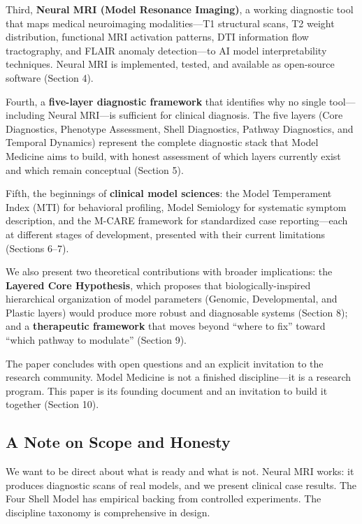 \documentclass[11pt]{article}
\begin{document}
Third, \textbf{Neural MRI (Model Resonance Imaging)}, a working diagnostic tool that maps medical neuroimaging modalities---T1 structural scans, T2 weight distribution, functional MRI activation patterns, DTI information flow tractography, and FLAIR anomaly detection---to AI model interpretability techniques. Neural MRI is implemented, tested, and available as open-source software (Section 4).

Fourth, a \textbf{five-layer diagnostic framework} that identifies why no single tool---including Neural MRI---is sufficient for clinical diagnosis. The five layers (Core Diagnostics, Phenotype Assessment, Shell Diagnostics, Pathway Diagnostics, and Temporal Dynamics) represent the complete diagnostic stack that Model Medicine aims to build, with honest assessment of which layers currently exist and which remain conceptual (Section 5).

Fifth, the beginnings of \textbf{clinical model sciences}: the Model Temperament Index (MTI) for behavioral profiling, Model Semiology for systematic symptom description, and the M-CARE framework for standardized case reporting---each at different stages of development, presented with their current limitations (Sections 6--7).

We also present two theoretical contributions with broader implications: the \textbf{Layered Core Hypothesis}, which proposes that biologically-inspired hierarchical organization of model parameters (Genomic, Developmental, and Plastic layers) would produce more robust and diagnosable systems (Section 8); and a \textbf{therapeutic framework} that moves beyond ``where to fix'' toward ``which pathway to modulate'' (Section 9).

The paper concludes with open questions and an explicit invitation to the research community. Model Medicine is not a finished discipline---it is a research program. This paper is its founding document and an invitation to build it together (Section 10).

\subsection{A Note on Scope and Honesty}

We want to be direct about what is ready and what is not. Neural MRI works: it produces diagnostic scans of real models, and we present clinical case results. The Four Shell Model has empirical backing from controlled experiments. The discipline taxonomy is comprehensive in design.
\end{document}
